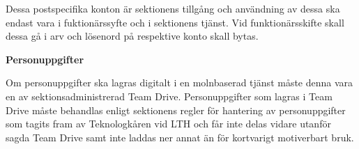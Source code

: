 \documentclass[../_main/handlingar.tex]{subfiles}
\begin{document}
    Dessa postspecifika konton är sektionens tillgång och användning av dessa ska endast vara i fuktionärssyfte och i sektionens tjänst. 
    Vid funktionärsskifte skall dessa gå i arv och lösenord på respektive konto skall bytas. 
    
    
    \vspace{6px}

    \newpage
    
    {\Large \textbf{Personuppgifter}}

    \vspace{6px}
    Om personuppgifter ska lagras digitalt i en molnbaserad tjänst måste denna vara en av sektionsadministrerad Team Drive. 
    Personuppgifter som lagras i Team Drive måste behandlas enligt sektionens regler för hantering av personuppgifter som tagits fram av Teknologkåren vid LTH och får inte delas vidare utanför sagda Team Drive samt inte laddas ner annat än för kortvarigt motiverbart bruk.
\newpage
\end{document}
